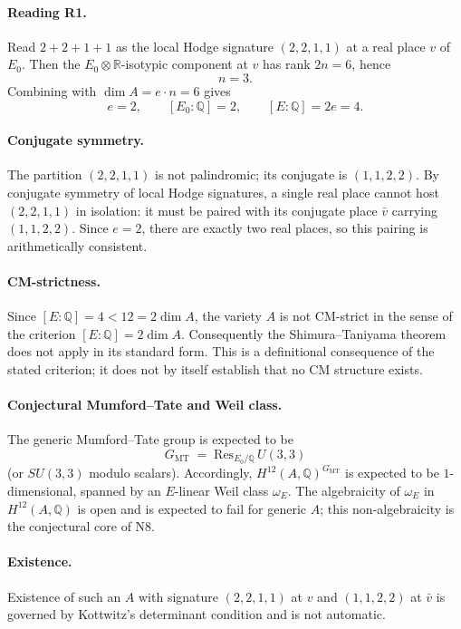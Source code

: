 \documentclass{article}
\begin{document}
\paragraph{Reading R1.}
Read \(2+2+1+1\) as the local Hodge signature \((2,2,1,1)\) at a real place \(v\) of \(E_{0}\). Then the \(E_{0}\otimes\mathbb{R}\)-isotypic component at \(v\) has rank \(2n=6\), hence
\[
n = 3 .
\]
Combining with \(\dim A = e\cdot n = 6\) gives
\[
e = 2, \qquad [E_{0}:\mathbb{Q}] = 2, \qquad [E:\mathbb{Q}] = 2e = 4 .
\]

\paragraph{Conjugate symmetry.}
The partition \((2,2,1,1)\) is not palindromic; its conjugate is \((1,1,2,2)\). By conjugate symmetry of local Hodge signatures, a single real place cannot host \((2,2,1,1)\) in isolation: it must be paired with its conjugate place \(\bar v\) carrying \((1,1,2,2)\). Since \(e=2\), there are exactly two real places, so this pairing is arithmetically consistent.

\paragraph{CM-strictness.}
Since \([E:\mathbb{Q}] = 4 < 12 = 2\dim A\), the variety \(A\) is not CM-strict in the sense of the criterion \([E:\mathbb{Q}] = 2\dim A\). Consequently the Shimura--Taniyama theorem does not apply in its standard form. This is a definitional consequence of the stated criterion; it does not by itself establish that no CM structure exists.

\paragraph{Conjectural Mumford--Tate and Weil class.}
The generic Mumford--Tate group is expected to be
\[
G_{\mathrm{MT}} \;=\; \mathrm{Res}_{E_{0}/\mathbb{Q}}\, U(3,3)
\]
(or \(SU(3,3)\) modulo scalars). Accordingly, \(H^{12}(A,\mathbb{Q})^{G_{\mathrm{MT}}}\) is expected to be \(1\)-dimensional, spanned by an \(E\)-linear Weil class \(\omega_{E}\). The algebraicity of \(\omega_{E}\) in \(H^{12}(A,\mathbb{Q})\) is open and is expected to fail for generic \(A\); this non-algebraicity is the conjectural core of N8.

\paragraph{Existence.}
Existence of such an \(A\) with signature \((2,2,1,1)\) at \(v\) and \((1,1,2,2)\) at \(\bar v\) is governed by Kottwitz's determinant condition and is not automatic.
\end{document}
